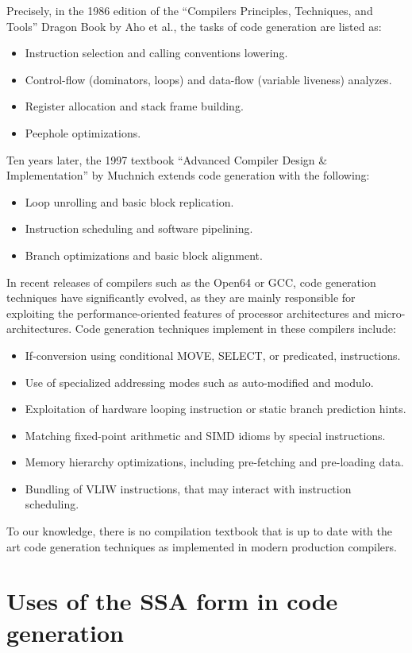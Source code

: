 Precisely, in the 1986 edition of
the ``Compilers Principles, Techniques, and Tools'' Dragon Book by Aho et al.,
the tasks of code generation are listed as:
\begin{itemize}
\item Instruction selection and calling conventions lowering.
\item Control-flow (dominators, loops) and data-flow (variable liveness) analyzes.
\item Register allocation and stack frame building.
\item Peephole optimizations.
\end{itemize}
Ten years later, the 1997 textbook ``Advanced Compiler Design \& Implementation''
by Muchnich extends code generation with the following: \begin{itemize}
\item Loop unrolling and basic block replication.
\item Instruction scheduling and software pipelining.
\item Branch optimizations and basic block alignment.
\end{itemize}
In recent releases of compilers such as the Open64 or GCC, code generation
techniques have significantly evolved, as they are mainly responsible for
exploiting the performance-oriented features of processor architectures and
micro-architectures. Code generation techniques implement in these compilers
include: \begin{itemize}
\item If-conversion using conditional MOVE, SELECT, or predicated, instructions.
\item Use of specialized addressing modes such as auto-modified and modulo.
\item Exploitation of hardware looping instruction or static branch prediction
hints.
\item Matching fixed-point arithmetic and SIMD idioms by special instructions.
\item Memory hierarchy optimizations, including pre-fetching and pre-loading
data.
\item Bundling of VLIW instructions, that may interact with instruction
scheduling.
\end{itemize}
To our knowledge, there is no compilation textbook that is up to date with the
art code generation techniques as implemented in modern production compilers.
\medskip

\section{Uses of the SSA form in code generation}

